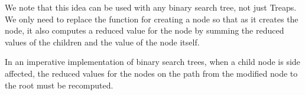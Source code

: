 \begin{chapter}
We note that this idea can be used with any binary search tree, not
just Treaps.  We only need to replace the function for creating a node
so that as it creates the node, it also computes a reduced value for
the node by summing the reduced values of the children and the value
of the node itself.

\begin{remark}
  In an imperative implementation of binary search trees, when a child
  node is side affected, the reduced values for the nodes on the path
  from the modified node to the root must be recomputed.
\end{remark}








\end{chapter}
